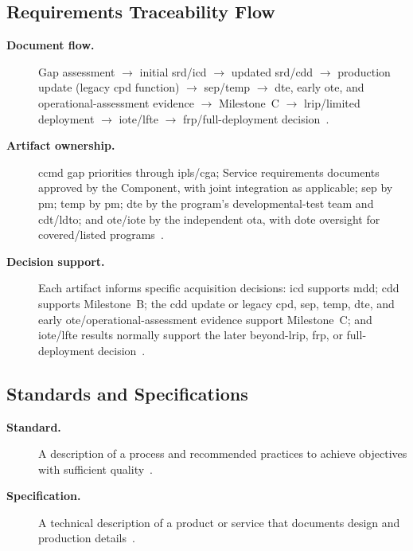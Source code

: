 \documentclass[../main.tex]{subfiles}
\begin{document}
\subsection{Requirements Traceability Flow}
\begin{description}
  \item[\textbf{Document flow.}] Gap assessment $\rightarrow$ initial \ac{srd}/\ac{icd} $\rightarrow$ updated \ac{srd}/\ac{cdd} $\rightarrow$ production update (legacy \ac{cpd} function) $\rightarrow$ \ac{sep}/\ac{temp} $\rightarrow$ \ac{dte}, early \ac{ote}, and operational-assessment evidence $\rightarrow$ Milestone~C $\rightarrow$ \ac{lrip}/limited deployment $\rightarrow$ \ac{iote}/\ac{lfte} $\rightarrow$ \ac{frp}/full-deployment decision~\autocite{DoDI5000-85,DoDI5000-98,edo-3-3-3-jfrp-2026}.
  \item[\textbf{Artifact ownership.}] \ac{ccmd} gap priorities through \acp{ipl}/\ac{cga}; Service requirements documents approved by the Component, with joint integration as applicable; \ac{sep} by \ac{pm}; \ac{temp} by \ac{pm}; \ac{dte} by the program's developmental-test team and \ac{cdt}/\ac{ldto}; and \ac{ote}/\ac{iote} by the independent \ac{ota}, with \ac{dote} oversight for covered/listed programs~\autocite{DoDI5000-85,DoDI5000-98,edo-3-3-3-jfrp-2026}.
  \item[\textbf{Decision support.}] Each artifact informs specific acquisition decisions: \ac{icd} supports \ac{mdd}; \ac{cdd} supports Milestone~B; the \ac{cdd} update or legacy \ac{cpd}, \ac{sep}, \ac{temp}, \ac{dte}, and early \ac{ote}/operational-assessment evidence support Milestone~C; and \ac{iote}/\ac{lfte} results normally support the later beyond-\ac{lrip}, \ac{frp}, or full-deployment decision~\autocite{DoDI5000-85,DoDI5000-98,edo-3-3-3-jfrp-2026}.
\end{description}

\subsection{Standards and Specifications}
\begin{description}
  \item[\textbf{Standard.}] A description of a process and recommended practices to achieve objectives with sufficient quality~\autocite{edo-3-5-1-systems-engineering-overview-2025}.
  \item[\textbf{Specification.}] A technical description of a product or service that documents design and production details~\autocite{edo-3-5-1-systems-engineering-overview-2025}.
\end{description}
\end{document}
